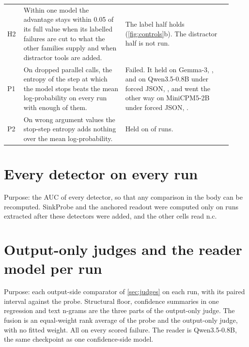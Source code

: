 \begin{center}
\begin{tabular}{p{0.06\linewidth}p{0.42\linewidth}p{0.44\linewidth}}
H2 & Within one model the advantage stays within 0.05 of its full value when its labelled failures are cut to what the other families supply and when distractor tools are added. & The label half holds (\cref{fig:controls}b). The distractor half is not run. \\
P1 & On dropped parallel calls, the entropy of the step at which the model stops beats the mean log-probability on every run with enough of them. & Failed. It held on Gemma-3, \stopMcGemma{}, and on Qwen3.5-0.8B under forced JSON, \stopMcQwenThreeFiveJson{}, and went the other way on MiniCPM5-2B under forced JSON, \stopMcMiniCpmJson{}. \\
P2 & On wrong argument values the stop-step entropy adds nothing over the mean log-probability. & Held on \nStopWavNoGain{} of \nStopWavRuns{} runs. \\
\bottomrule
\end{tabular}
\end{center}

\section{Every detector on every run}
\label{app:detectors}

Purpose: the AUC of every detector, so that any comparison in the body can be recomputed. SinkProbe and the anchored readout were computed only on runs extracted after these detectors were added, and the other cells read n.c.

\begin{center}\scriptsize

\end{center}

\section{Output-only judges and the reader model per run}
\label{app:judges}

Purpose: each output-side comparator of \cref{sec:judges} on each run, with its paired interval against the probe. Structural floor, confidence summaries in one regression and text n-grams are the three parts of the output-only judge. The fusion is an equal-weight rank average of the probe and the output-only judge, with no fitted weight. All on every scored failure. The reader is Qwen3.5-0.8B, the same checkpoint as one confidence-side model.

\begin{center}\scriptsize\setlength{\tabcolsep}{3pt}

\end{center}

